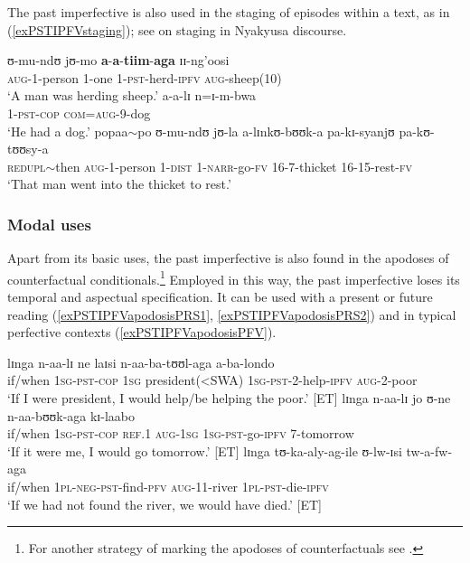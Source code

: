 The past imperfective is also used in the staging of episodes within a text, as in (\ref{exPSTIPFVstaging}); see  on staging in Nyakyusa  discourse.
\begin{exe}
\ex \label{exPSTIPFVstaging}
\begin{xlist}
\ex \gll ʊ-mu-ndʊ jʊ-mo \textbf{a}-\textbf{a}-\textbf{tiim}-\textbf{aga} ɪɪ-ng'oosi\\
\textsc{aug}-1-person 1-one 1-\textsc{pst}-herd-\textsc{ipfv} \textsc{aug}-sheep(10)\\
\glt \lq A man was herding sheep.'
\ex \gll a-a-lɪ n=ɪ-m-bwa\\
1-\textsc{pst}-\textsc{cop} \textsc{com}=\textsc{aug}-9-dog\\
\glt \lq He had a dog.'
\ex \gll popaa$\sim$po ʊ-mu-ndʊ jʊ-la a-lɪnkʊ-bʊʊk-a pa-kɪ-syanjʊ pa-kʊ-tʊʊsy-a\\
\textsc{redupl}$\sim$then \textsc{aug}-1-person 1-\textsc{dist} 1-\textsc{narr}-go-\textsc{fv} 16-7-thicket 16-15-rest-\textsc{fv}\\
\glt \lq That man went into the thicket to rest.'
\end{xlist}
\end{exe}

\subsubsection{Modal uses}\label{PastImperfectiveModal}
Apart from its basic uses, the past imperfective is also found in the apodoses of counterfactual conditionals.\footnote{For another strategy of marking the apodoses of counterfactuals see .} Employed in this way, the past imperfective loses its temporal and aspectual specification. It can be used with a present or future reading (\ref{exPSTIPFVapodosisPRS1}, \ref{exPSTIPFVapodosisPRS2}) and in typical perfective contexts (\ref{exPSTIPFVapodosisPFV}).

\begin{exe}
\ex \label{exPSTIPFVapodosisPRS1} \gll lɪnga n-aa-lɪ ne laɪsi n-aa-ba-tʊʊl-aga a-ba-londo\\
if/when \textsc{1sg}-\textsc{pst}-\textsc{cop} \textsc{1sg} president(<SWA) \textsc{1sg}-\textsc{pst}-2-help-\textsc{ipfv} \textsc{aug}-2-poor\\
\glt `If I were president, I would help/be helping the poor.' [ET]
\ex \label{exPSTIPFVapodosisPRS2} \gll lɪnga n-aa-lɪ jo ʊ-ne n-aa-bʊʊk-aga kɪ-laabo\\
if/when \textsc{1sg}-\textsc{pst}-\textsc{cop} \textsc{ref.1} \textsc{aug}-\textsc{1sg} \textsc{1sg}-\textsc{pst}-go-\textsc{ipfv} 7-tomorrow\\
\glt \lq If it were me, I would go tomorrow.' [ET]
\ex \label{exPSTIPFVapodosisPFV} \gll lɪnga tʊ-ka-aly-ag-ile ʊ-lw-ɪsi tw-a-fw-aga\\
if/when \textsc{1pl}-\textsc{neg}-\textsc{pst}-find-\textsc{pfv} \textsc{aug}-11-river \textsc{1pl}-\textsc{pst}-die-\textsc{ipfv}\\
\glt `If we had not found the river, we would have died.' [ET]
\end{exe}


